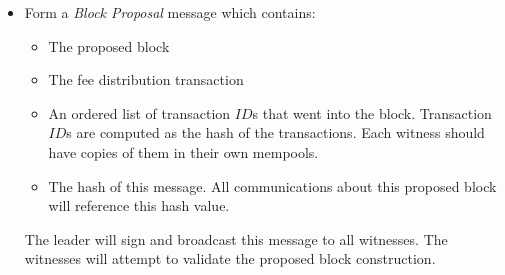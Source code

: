 \documentclass[a4paper, 10pt, conference]{ieeeconf}
\begin{document}
\begin{itemize}
{		\begin{itemize}
			\item {Block Type ID, 1}
			\item {Version number}
			\item {Epoch number}
			\item {Previous block hash, computed as the hash of the block header of the current blockchain tip block}
			\item {$\gamma_{blk} = \sum{\gamma_{adj}}$, the sum of all $\gamma_{adj}$ terms found in the block transactions, which includes the $\gamma_{adj}$ from the leader's fee distribution transaction.}
			\item {Root hash of the TXIN Merkle tree}
			\item {Root hash of the TXOUT Merkle tree}
			\item {BLS multi-signature, to be filled in as a result of the consensus on the block.\footnote{We use pairing-based cryptography to support the use of short and fast BLS signatures. BLS signatures allow the formation of multi-signatures in one pass over the witness pool.}}
			\item {Bitmap of signers in the multi-signature}
		\end{itemize}}

	The initial contents of the BLS multi-signature slots should be zero filled and, even after being filled in, never contribute to the computation of any \textit{block header hash}. All other slots are concatenated to form a header hash pre-image. But when a full hash of the block is formed for messaging purposes, the entire block, consisting of block header and block body, is considered for the hash pre-image.

	\item{Form a \textit{Block Proposal} message which contains:
		\begin{itemize}
			\item {The proposed block}
			\item {The fee distribution transaction}
			\item {An ordered list of transaction $ID$s that went into the block. Transaction $ID$s are computed as the hash of the transactions. Each witness should have copies of them in their own mempools.}
			\item {The hash of this message. All communications about this proposed block will reference this hash value.}
		\end{itemize}
	The leader will sign and broadcast this message to all witnesses. The witnesses will attempt to validate the proposed block construction.}
\end{itemize}
\end{document}
